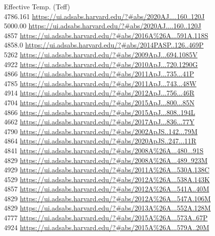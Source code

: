 Effective Temp. (Teff)\\
4786.161 \url{https://ui.adsabs.harvard.edu/?#abs/2020AJ....160..120J}\\
5000.00 \url{https://ui.adsabs.harvard.edu/?#abs/2020AJ....160..120J}\\
4857 \url{https://ui.adsabs.harvard.edu/?#abs/2016A%26A...591A.118S}\\
4858.0 \url{https://ui.adsabs.harvard.edu/?#abs/2014PASP..126..469P}\\
5262 \url{https://ui.adsabs.harvard.edu/?#abs/2009ApJ...694.1085V}\\
4922 \url{https://ui.adsabs.harvard.edu/?#abs/2010ApJ...720.1290G}\\
4866 \url{https://ui.adsabs.harvard.edu/?#abs/2011ApJ...735...41P}\\
4785 \url{https://ui.adsabs.harvard.edu/?#abs/2011ApJ...743...48W}\\
4914 \url{https://ui.adsabs.harvard.edu/?#abs/2012ApJ...756...46R}\\
4704 \url{https://ui.adsabs.harvard.edu/?#abs/2015ApJ...800...85N}\\
4866 \url{https://ui.adsabs.harvard.edu/?#abs/2015ApJ...808..194L}\\
4662 \url{https://ui.adsabs.harvard.edu/?#abs/2017ApJ...836...77Y}\\
4790 \url{https://ui.adsabs.harvard.edu/?#abs/2002ApJS..142...79M}\\
4864 \url{https://ui.adsabs.harvard.edu/?#abs/2020ApJS..247...11R}\\
4841 \url{https://ui.adsabs.harvard.edu/?#abs/2008A%26A...480...91S}\\
4829 \url{https://ui.adsabs.harvard.edu/?#abs/2008A%26A...489..923M}\\
4929 \url{https://ui.adsabs.harvard.edu/?#abs/2011A%26A...530A.138C}\\
4529 \url{https://ui.adsabs.harvard.edu/?#abs/2012A%26A...538A.143K}\\
4857 \url{https://ui.adsabs.harvard.edu/?#abs/2012A%26A...541A..40M}\\
4829 \url{https://ui.adsabs.harvard.edu/?#abs/2012A%26A...547A.106M}\\
4829 \url{https://ui.adsabs.harvard.edu/?#abs/2013A%26A...552A.128M}\\
4777 \url{https://ui.adsabs.harvard.edu/?#abs/2015A%26A...573A..67P}\\
4924 \url{https://ui.adsabs.harvard.edu/?#abs/2015A%26A...579A..20M}\\
